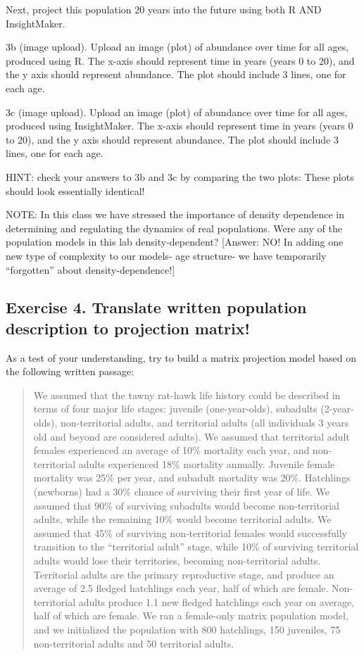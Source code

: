 \documentclass[
]{article}
\begin{document}
Next, project this population 20 years into the future using both R AND
InsightMaker.

3b (image upload). Upload an image (plot) of abundance over time for all
ages, produced using R. The x-axis should represent time in years (years
0 to 20), and the y axis should represent abundance. The plot should
include 3 lines, one for each age.

3c (image upload). Upload an image (plot) of abundance over time for all
ages, produced using InsightMaker. The x-axis should represent time in
years (years 0 to 20), and the y axis should represent abundance. The
plot should include 3 lines, one for each age.

HINT: check your answers to 3b and 3c by comparing the two plots: These
plots should look essentially identical!

NOTE: In this class we have stressed the importance of density
dependence in determining and regulating the dynamics of real
populations. Were any of the population models in this lab
density-dependent? {[}Answer: NO! In adding one new type of complexity
to our models- age structure- we have temporarily ``forgotten'' about
density-dependence!{]}

\hypertarget{exercise-4.-translate-written-population-description-to-projection-matrix}{%
\subsection{Exercise 4. Translate written population description to
projection
matrix!}\label{exercise-4.-translate-written-population-description-to-projection-matrix}}

As a test of your understanding, try to build a matrix projection model
based on the following written passage:

\begin{quote}
We assumed that the tawny rat-hawk life history could be described in
terms of four major life stages: juvenile (one-year-olds), subadults
(2-year-olds), non-territorial adults, and territorial adults (all
individuals 3 years old and beyond are considered adults). We assumed
that territorial adult females experienced an average of 10\% mortality
each year, and non-territorial adults experienced 18\% mortality
annually. Juvenile female mortality was 25\% per year, and subadult
mortality was 20\%. Hatchlings (newborns) had a 30\% chance of surviving
their first year of life. We assumed that 90\% of surviving subadults
would become non-territorial adults, while the remaining 10\% would
become territorial adults. We assumed that 45\% of surviving
non-territorial females would successfully transition to the
``territorial adult'' stage, while 10\% of surviving territorial adults
would lose their territories, becoming non-territorial adults.
Territorial adults are the primary reproductive stage, and produce an
average of 2.5 fledged hatchlings each year, half of which are female.
Non-territorial adults produce 1.1 new fledged hatchlings each year on
average, half of which are female. We ran a female-only matrix
population model, and we initialized the population with 800 hatchlings,
150 juveniles, 75 non-territorial adults and 50 territorial adults.
\end{quote}
\end{document}
